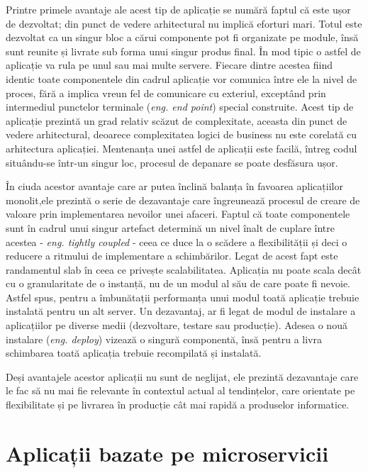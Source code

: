 \documentclass[12pt, a4paper, oneside, romanian]{teza-upb}
\begin{document}
Printre primele avantaje ale acest tip de aplicație se numără faptul că este ușor de dezvoltat; din punct de vedere arhitectural nu implică eforturi mari. Totul este dezvoltat ca un singur bloc a cărui componente pot fi organizate pe module, însă sunt reunite și livrate sub forma unui singur produs final. În mod tipic o astfel de aplicație va rula pe unul sau mai multe servere. Fiecare dintre acestea fiind identic toate componentele din cadrul aplicație vor comunica între ele la nivel de proces, fără a implica vreun fel de comunicare cu exteriul, exceptând prin intermediul punctelor terminale (\textit{eng. end point}) special construite. Acest tip de aplicație prezintă un grad relativ scăzut de complexitate, aceasta din punct de vedere arhitectural, deoarece complexitatea logici de business nu este corelată cu arhitectura aplicației. Mentenanța unei astfel de aplicații este facilă, întreg codul situându-se într-un singur loc, procesul de depanare se poate desfăsura ușor. 

În ciuda acestor avantaje care ar putea înclină balanța în favoarea aplicațiilor monolit,ele prezintă o serie de dezavantaje care îngreunează procesul de creare de valoare prin implementarea nevoilor unei afaceri. Faptul că toate componentele sunt în cadrul unui singur artefact determină un nivel înalt de cuplare între acestea - \textit{eng. tightly coupled} - ceea ce duce la o scădere a flexibilității și deci o reducere a ritmului de implementare a schimbărilor. Legat de acest fapt este randamentul slab în ceea ce privește scalabilitatea. Aplicația nu poate scala decât cu o granularitate de o instanță, nu de un modul al său de care poate fi nevoie. Astfel spus, pentru a îmbunătații performanța unui modul toată aplicație trebuie instalată pentru un alt server. Un dezavantaj, ar fi legat de modul de instalare a aplicațiilor pe diverse medii (dezvoltare, testare sau producție). Adesea o nouă instalare (\textit{eng. deploy}) vizează o singură componentă, însă pentru a livra schimbarea toată aplicația trebuie recompilată și instalată.

Deși avantajele acestor aplicații nu sunt de neglijat, ele prezintă dezavantaje care le fac să nu mai fie relevante în contextul actual al tendințelor, care orientate pe flexibilitate și pe livrarea în producție cât mai rapidă a produselor informatice. 

\chapter{Aplicații bazate pe microservicii}
\end{document}
